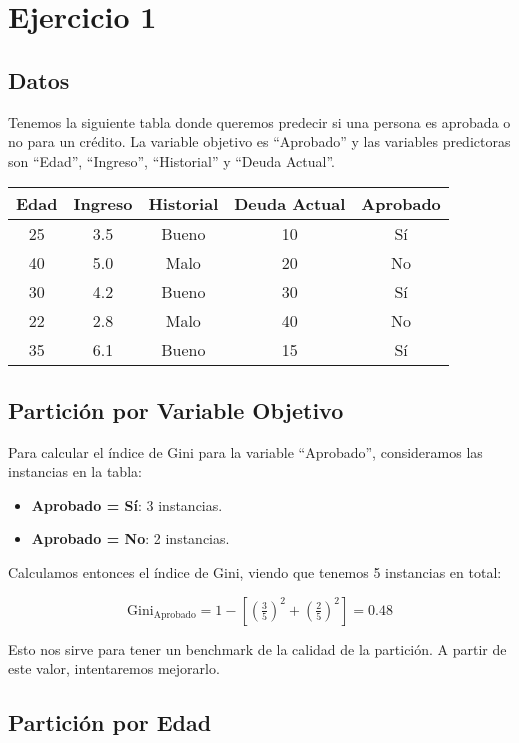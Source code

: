 \documentclass[12pt]{article}
\begin{document}
\section{Ejercicio 1}
\subsection{Datos}

Tenemos la siguiente tabla donde queremos predecir si una persona es aprobada o no para un crédito. La variable objetivo es ``Aprobado'' y las variables predictoras son ``Edad'', ``Ingreso'', ``Historial'' y ``Deuda Actual''.

\begin{table}[h]
  \centering
  \begin{tabular}{ccccc}
    \toprule
    Edad & Ingreso & Historial & Deuda Actual & Aprobado \\
    \midrule
    25 & 3.5 & Bueno & 10 & Sí \\
    40 & 5.0 & Malo & 20 & No \\
    30 & 4.2 & Bueno & 30 & Sí \\
    22 & 2.8 & Malo & 40 & No \\
    35 & 6.1 & Bueno & 15 & Sí \\
    \bottomrule
  \end{tabular}
\end{table}

\subsection{Partición por Variable Objetivo}
Para calcular el índice de Gini para la variable ``Aprobado'', consideramos las instancias en la tabla:

\begin{itemize}
  \item \textbf{Aprobado = Sí}: 3 instancias.
  \item \textbf{Aprobado = No}: 2 instancias.
\end{itemize}

Calculamos entonces el índice de Gini, viendo que tenemos 5 instancias en total:

\[
  \mathrm{Gini}_{\text{Aprobado}} = 1 - \left[\left(\tfrac{3}{5}\right)^2 + \left(\tfrac{2}{5}\right)^2\right] = 0.48
\]

Esto nos sirve para tener un benchmark de la calidad de la partición. A partir de este valor, intentaremos mejorarlo.

\subsection{Partición por Edad}
\end{document}
